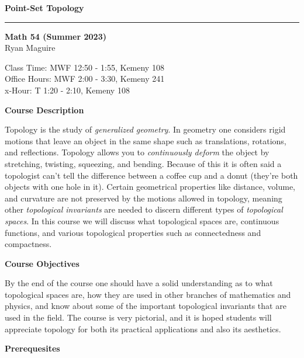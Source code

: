\documentclass{article}
\begin{document}
    \LARGE
    \textbf{Point-Set Topology}
    \hrule\par\hfill\par
    \normalsize
    \textbf{Math 54 (Summer 2023)}\\
    Ryan Maguire\\
    \color{gray}{Ryan.J.Maguire.GR@dartmouth.edu}
    \par\vspace{0.5cm}
    \color{black}
    Class Time: MWF 12:50 - 1:55, Kemeny 108\\
    Office Hours: MWF 2:00 - 3:30, Kemeny 241\\
    x-Hour: T 1:20 - 2:10, Kemeny 108
    \par\vspace{0.5cm}
    \textbf{Course Description}
    \par\hfill\par
    Topology is the study of \textit{generalized geometry}. In geometry one
    considers rigid motions that leave an object in the same shape such as
    translations, rotations, and reflections. Topology allows you to
    \textit{continuously deform} the object by stretching, twisting, squeezing,
    and bending. Because of this it is often said a topologist can't tell the
    difference between a coffee cup and a donut (they're both objects with
    one hole in it). Certain geometrical properties like distance, volume,
    and curvature are not preserved by the motions allowed in topology,
    meaning other \textit{topological invariants} are needed to discern
    different types of \textit{topological spaces}. In this course we will
    discuss what topological spaces are, continuous functions, and various
    topological properties such as connectedness and compactness.
    \par\hfill\par
    \textbf{Course Objectives}
    \par\hfill\par
    By the end of the course one should have a solid understanding as to what
    topological spaces are, how they are used in other branches of mathematics
    and physics, and know about some of the important topological invariants
    that are used in the field. The course is very pictorial, and it is hoped
    students will appreciate topology for both its practical applications and
    also its aesthetics.
    \par\hfill\par
    \textbf{Prerequesites}
    \par\hfill\par
\end{document}
